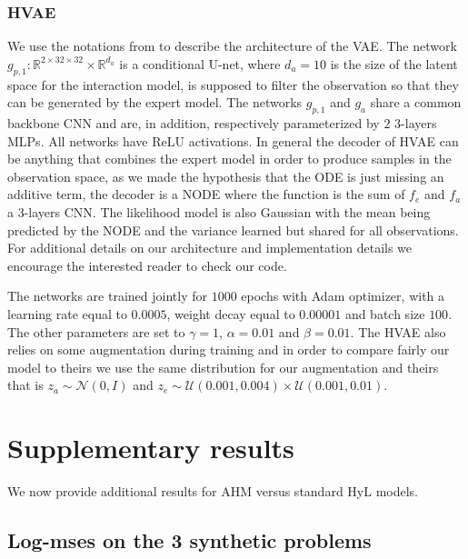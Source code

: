 \documentclass{article}
\begin{document}
\subsubsection{HVAE}
We use the notations from \citet{HVAE} to describe the architecture of the VAE. The network $g_{p, 1}: \mathbb{R}^{2\times 32 \times 32} \times \mathbb{R}^{d_a}$ is a conditional U-net, where $d_a=10$ is the size of the latent space for the interaction model, is supposed to filter the observation so that they can be generated by the expert model. The networks $g_{p, 1}$ and $g_a$ share a common backbone CNN and are, in addition, respectively parameterized by $2$ $3$-layers MLPs. All networks have ReLU activations. In general the decoder of HVAE can be anything that combines the expert model in order to produce samples in the observation space, as we made the hypothesis that the ODE is just missing an additive term, the decoder is a NODE where the function is the sum of $f_e$ and $f_a$ a $3$-layers CNN. The likelihood model is also Gaussian with the mean being predicted by the NODE and the variance learned but shared for all observations. For additional details on our architecture and implementation details we encourage the interested reader to check our code. 

The networks are trained jointly for $1000$ epochs with Adam optimizer, with a learning rate equal to $0.0005$, weight decay equal to $0.00001$ and batch size $100$. The other parameters are set to $\gamma = 1$, $\alpha=0.01$ and $\beta=0.01$. The HVAE also relies on some augmentation during training and in order to compare fairly our model to theirs we use the same distribution for our augmentation and theirs that is $z_a \sim \mathcal{N}(0, I)$ and $z_e \sim \mathcal{U}(0.001, 0.004) \times \mathcal{U}(0.001, 0.01)$. 

\section{Supplementary results}\label{app:supp_results}
We now provide additional results for AHM versus standard HyL models.
\subsection{Log-mses on the 3 synthetic problems}
\end{document}

